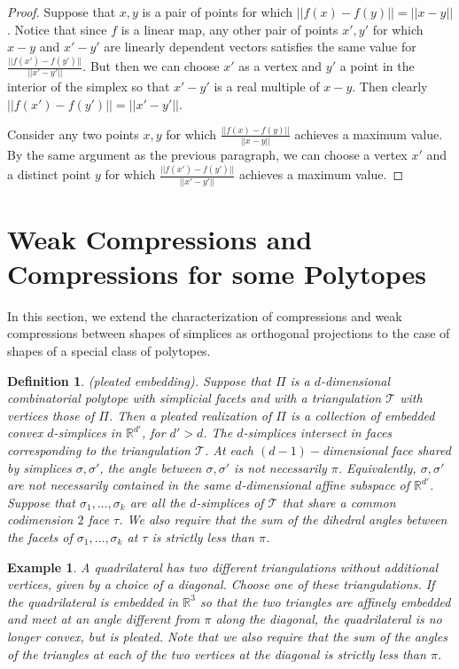 \documentclass[a4paper, 12pt]{amsart}
\theoremstyle{plain}
\newtheorem{Ex}[Thm]{Example}
\newtheorem{Def}[Thm]{Definition}
\begin{document}
\begin{proof}

Suppose that $x,y$ is a pair of points for which $||f(x)-f(y)||=||x-y||$. Notice that since $f$ is a linear map, any other pair of points $x',y'$ for which $x-y$ and $x'-y'$ are linearly dependent vectors satisfies the same value for $\frac{||f(x')-f(y')||}{||x'-y'||}$. But then we can choose $x'$ as a vertex and $y'$ a point in the interior of the simplex so that $x'-y'$ is a real multiple of $x-y$. Then clearly $||f(x')-f(y')||=||x'-y'||$.

Consider any two points $x,y$ for which $\frac{||f(x)-f(y)||}{||x-y||}$ achieves a maximum value. By the same argument as the previous paragraph, we can choose a vertex $x'$ and a distinct point $y$ for which $\frac{||f(x')-f(y')||}{||x'-y'||}$ achieves a maximum value. 

\end{proof}

 

\section{Weak Compressions and Compressions for some Polytopes}

In this section, we extend the characterization of compressions and weak compressions between shapes of simplices as orthogonal projections to the case of shapes of a special class of polytopes. 

\begin{Def} (pleated embedding).
Suppose that $\Pi$ is a $d$-dimensional combinatorial polytope with simplicial facets and with a triangulation $\mathcal T$ with vertices those of $\Pi$. Then a pleated realization of $\Pi$ is a collection of embedded convex $d$-simplices in $\mathbb{R}^{d'}$, for $d' > d$. The $d$-simplices intersect in faces corresponding to the triangulation $\mathcal T$. At each $(d-1)-$dimensional face shared by simplices $\sigma, \sigma'$, the angle between $\sigma, \sigma'$ is not necessarily $\pi$. Equivalently, $\sigma, \sigma'$ are not necessarily contained in the same $d$-dimensional affine subspace of $\mathbb{R}^{d'}$. Suppose that $\sigma_1, \dots ,\sigma_k$ are all the $d$-simplices of $\mathcal T$ that share a common codimension $2$ face $\tau$. We also require that the sum of the dihedral angles between the facets of $\sigma_1, \dots ,\sigma_k$  at $\tau$ is strictly less than $\pi$.
\end{Def} 

\begin{Ex}
A quadrilateral has two different triangulations without additional vertices, given by a choice of a diagonal. Choose one of these triangulations. If the quadrilateral is embedded in $\mathbb{R}^3$ so that the two triangles are affinely embedded and meet at an angle different from $\pi$ along the diagonal, the quadrilateral is no longer convex, but is pleated.
Note that we also require that the sum of the angles of the triangles at each of the two vertices at the diagonal is strictly less than $\pi$. 
\end{Ex}
\end{document}
